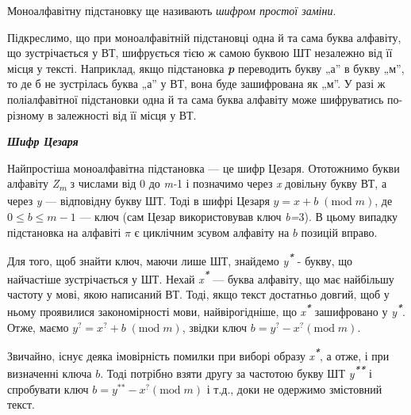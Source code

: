 Моноалфавітну підстановку ще називають \textit{шифром простої заміни}.

Підкреслимо, що при моноалфавітній підстановці одна й та сама буква алфавіту, що
зустрічається у ВТ, шифрується тією ж самою буквою ШТ незалежно від її місця у
тексті. Наприклад, якщо підстановка \textbf{\textit{\textgreek{p}}} переводить
букву „а” в  букву „м”, то де б не зустрілась буква „а” у ВТ, вона буде
зашифрована як „м”. У разі ж поліалфавітної підстановки одна й та сама буква
алфавіту може шифруватись по-різному в залежності від її місця у ВТ.


\bigskip


\bigskip

{\centering\bfseries\itshape
Шифр Цезаря
\par}


\bigskip


\bigskip

Найпростіша моноалфавітна підстановка --- це шифр Цезаря. Ототожнимо букви
алфавіту \textit{Z}\textit{\textsubscript{m}} з числами від\textbf{ }0 до
\textit{m-}1 і позначимо через \textit{x} довільну букву ВТ, а через \textit{y}
--- відповідну букву ШТ. Тоді в шифрі Цезаря   ${y=x+b\;(\text{mod}\;m)}$, де 
${0\le b\le m-1}$ --- ключ (сам Цезар використовував ключ \textit{b}\textit{=}3).
В цьому випадку підстановка на алфавіті  ${\pi }$ є циклічним зсувом алфавіту
на  ${b}$ позицій вправо.

Для того, щоб знайти ключ, маючи лише ШТ, знайдемо
\textit{y}\textbf{\textit{\textsuperscript{*}}} - букву, що найчастіше
зустрічається у ШТ. Нехай \textit{x}\textbf{\textit{\textsuperscript{*}}} ---
буква алфавіту, що має найбільшу частоту у мові, якою написаний ВТ. Тоді, якщо
текст достатньо довгий, щоб у ньому проявилися закономірності мови,
найвірогідніше, що \textit{x}\textbf{\textit{\textsuperscript{*}}} зашифровано
у  \textit{y}\textbf{\textit{\textsuperscript{*}}}. Отже, маємо 
${y^{{?}}=x^{{?}}+b\;(\text{mod}\;m)}$, звідки ключ 
${b=y^{{?}}-x^{{?}}(\text{mod}\;m)}$.

Звичайно, існує деяка імовірність помилки при виборі образу
\textit{x}\textbf{\textit{\textsuperscript{*}}}, а отже, і при визначенні ключа
 ${b}$. Тоді потрібно взяти другу за частотою букву ШТ
\textit{y}\textbf{\textit{\textsuperscript{** }}}і спробувати ключ  
${b=y^{{\text{**}}}-x^{{?}}(\text{mod}\;m)}$ і т.д., доки не одержимо
змістовний текст.


\bigskip


\bigskip


\bigskip


